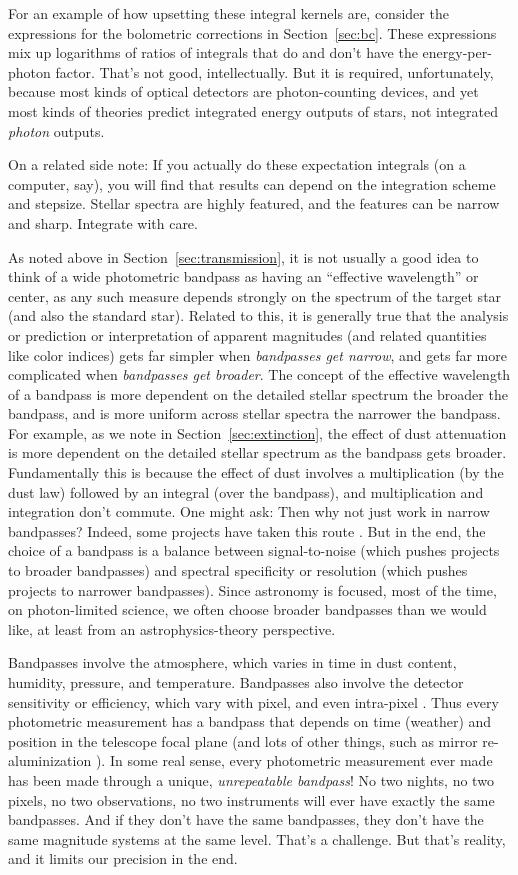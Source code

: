 \documentclass[10pt]{article}
\newcommand{\sectionname}{Section}
\newcommand{\secref}[1]{\sectionname~\ref{#1}}
\begin{document}
For an example of how upsetting these integral kernels are, consider the expressions for the bolometric corrections in \secref{sec:bc}.
These expressions mix up logarithms of ratios of integrals that do and don't have the energy-per-photon factor.
That's not good, intellectually.
But it is required, unfortunately, because most kinds of optical detectors are photon-counting devices, and yet most kinds of theories predict integrated energy outputs of stars, not integrated \emph{photon} outputs.

On a related side note:
If you actually do these expectation integrals (on a computer, say), you will find that results can depend on the integration scheme and stepsize.
Stellar spectra are highly featured, and the features can be narrow and sharp.
Integrate with care.

As noted above in \secref{sec:transmission}, it is not usually a good idea to think of a wide photometric bandpass as having an ``effective wavelength'' or center, as any such measure depends strongly on the spectrum of the target star (and also the standard star).
Related to this, it is generally true that the analysis or prediction or interpretation of apparent magnitudes (and related quantities like color indices) gets far simpler when \emph{bandpasses get narrow}, and gets far more complicated when \emph{bandpasses get broader}.
The concept of the effective wavelength of a bandpass is more dependent on the detailed stellar spectrum the broader the bandpass, and is more uniform across stellar spectra the narrower the bandpass.
For example, as we note in \secref{sec:extinction}, the effect of dust attenuation is more dependent on the detailed stellar spectrum as the bandpass gets broader.
Fundamentally this is because the effect of dust involves a multiplication (by the dust law) followed by an integral (over the bandpass), and multiplication and integration don't commute.
One might ask: Then why not just work in narrow bandpasses?
Indeed, some projects have taken this route \cite{combo17}.
But in the end, the choice of a bandpass is a balance between signal-to-noise (which pushes projects to broader bandpasses) and spectral specificity or resolution (which pushes projects to narrower bandpasses).
Since astronomy is focused, most of the time, on photon-limited science, we often choose broader bandpasses than we would like, at least from an astrophysics-theory perspective.

Bandpasses involve the atmosphere, which varies in time in dust content, humidity, pressure, and temperature.
Bandpasses also involve the detector sensitivity or efficiency, which vary with pixel, and even intra-pixel \cite{spitzerpixels}.
Thus every photometric measurement has a bandpass that depends on time (weather) and position in the telescope focal plane (and lots of other things, such as mirror re-aluminization \cite{ubercal}).
In some real sense, every photometric measurement ever made has been made through a unique, \emph{unrepeatable bandpass}!
No two nights, no two pixels, no two observations, no two instruments will ever have exactly the same bandpasses.
And if they don't have the same bandpasses, they don't have the same magnitude systems at the same level.
That's a challenge. But that's reality, and it limits our precision in the end.
\end{document}

